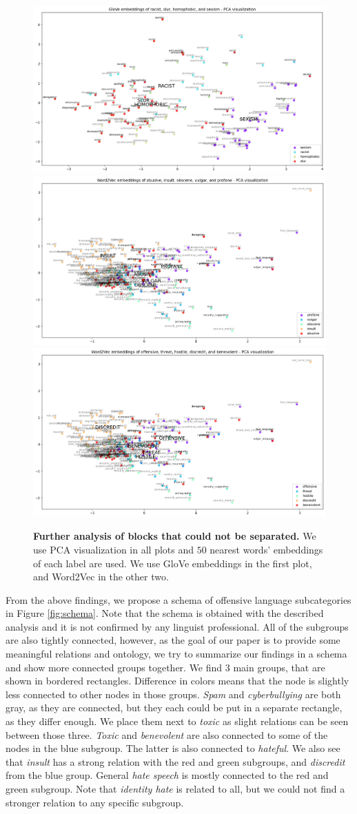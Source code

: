 \documentclass[fleqn,moreauthors,10pt]{ds_report}
\begin{document}
\begin{figure}[htb]\centering
	\includegraphics[width=0.33 \linewidth]{Further analysis - Glove - PCA.png}
	\includegraphics[width=0.33 \linewidth]{Further analysis1 Word2Vec - PCA.png}
	\includegraphics[width=0.33 \linewidth]{Further analysis2 Word2Vec - PCA.png}
	\caption{\textbf{Further analysis of blocks that could not be separated.} We use PCA visualization in all plots and $50$ nearest words' embeddings of each label are used. We use GloVe embeddings in the first plot, and Word2Vec in the other two.}
	\label{fig:further1}
\end{figure}

From the above findings, we propose a schema of offensive language subcategories in Figure \ref{fig:schema}. Note that the schema is obtained with the described analysis and it is not confirmed by any linguist professional. All of the subgroups are also tightly connected, however, as the goal of our paper is to provide some meaningful relations and ontology, we try to summarize our findings in a schema and show more connected groups together. We find $3$ main groups, that are shown in bordered rectangles. Difference in colors means that the node is slightly less connected to other nodes in those groups. \textit{Spam} and \textit{cyberbullying} are both gray, as they are connected, but they each could be put in a separate rectangle, as they differ enough. We place them next to \textit{toxic} as slight relations can be seen between those three. \textit{Toxic} and \textit{benevolent} are also connected to some of the nodes in the blue subgroup. The latter is also connected to \textit{hateful}. We also see that \textit{insult} has a strong relation with the red and green subgroups, and \textit{discredit} from the blue group. General \textit{hate speech} is mostly connected to the red and green subgroup. Note that \textit{identity hate} is related to all, but we could not find a stronger relation to any specific subgroup.
\end{document}
